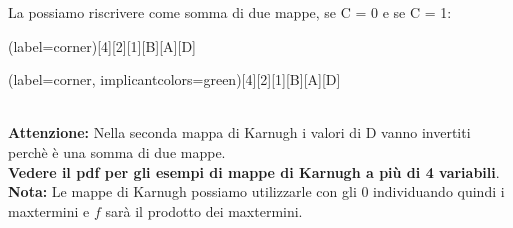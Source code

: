 \documentclass[12pt]{report}
\begin{document}
				La possiamo riscrivere come somma di due mappe, se C = 0 e se C = 1: \\
				\begin{karnaugh-map}(label=corner)[4][2][1][B][A][D]
				\end{karnaugh-map}  	\begin{karnaugh-map}(label=corner, implicantcolors={green})[4][2][1][B][A][D]
				\end{karnaugh-map} \\
				\textbf{Attenzione:} Nella seconda mappa di Karnugh i valori di D vanno invertiti perchè è una somma di due mappe. \\
				\textbf{Vedere il pdf per gli esempi di mappe di Karnugh a più di 4 variabili}. \\
				\textbf{Nota:} Le mappe di Karnugh possiamo utilizzarle con gli 0 individuando quindi i maxtermini e $f$ sarà il prodotto dei maxtermini.
\end{document}

